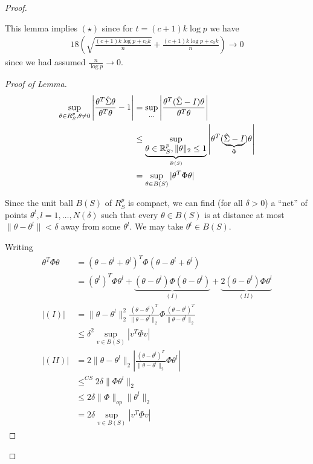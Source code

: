 \begin{proof}
\begin{lem}
    This lemma implies $(\star)$ since for $t = (c+1) k \log p$ we
    have
    \begin{align}
      \label{eq:158}
      18(\sqrt{\frac{(c+1)k \log p + c_{0} k}{n}} + \frac{(c+1)k \log
        p + c_{0} k}{n}) \rightarrow 0
    \end{align} since we had assumed $\frac{n}{\log p} \rightarrow 0$.
  \end{lem}
  \begin{proof}[Proof of Lemma]
    \begin{align}
      \label{eq:159}
      \sup_{\theta \in R^{p}_{S}, \theta \neq 0} \left|
        \frac{\theta^{T} \hat \Sigma \theta}{\theta^{T} \theta} - 1
      \right| &= \sup_{\dots} \left| \frac{\theta^{T} (\hat \Sigma - I)
          \theta}{\theta^{T} \theta} \right| \\
      &\leq \sup_{\underbrace{\theta \in \mathbb{R}^{p}_{S}, \| \theta \|_{2} \leq 1}_{B(S)}}
      \left| \theta^{T} (\underbrace{\hat \Sigma - I}_{\Phi}) \theta
      \right| \\
      &= \sup_{\theta \in B(S)} | \theta^{T} \Phi \theta |
    \end{align}

    Since the unit ball $B(S)$ of $R^{p}_{S}$ is compact, we can find
    (for all $\delta > 0$) a ``net'' of points $\theta^{l}, l = 1,
    \dots, N(\delta)$ such that every $\theta \in B(S)$ is at distance
    at most $\| \theta - \theta^{l} \| < \delta$ away from some
    $\theta^{l}$.  We may take $\theta^{l} \in B(S)$.

    Writing
    \begin{align}
      \label{eq:160}
      \theta^{T} \Phi \theta &= (\theta - \theta^{l} + \theta^{l})^{T}
      \Phi (\theta - \theta^{l} + \theta^{l}) \\
      &= (\theta^{l})^{T} \Phi \theta^{l} + \underbrace{(\theta -
        \theta^{l}) \Phi (\theta - \theta^{l})}_{(I)} +
      \underbrace{2(\theta - \theta^{l}) \Phi \theta^{l}}_{(II)} \\
      |(I)| &= \| \theta - \theta^{l} \|_{2}^{2} \frac{(\theta -
        \theta^{l})^{T}}{\| \theta - \theta^{l} \|_{2}} \Phi
      \frac{(\theta - \theta^{l})^{T}}{\| \theta - \theta^{l} \|_{2}}
      \\
      &\leq \delta^{2} \sup_{v \in B(S)} |v^{T} \Phi v| \\
      |(II)| &= 2 \|
      \theta - \theta^{l} \|_{2} \left| \frac{(\theta -
          \theta^{l})^{T}}{\| \theta - \theta^{l}\|_{2}} \Phi
        \theta^{l}
      \right| \\
      &\leq^{CS} 2 \delta \| \Phi \theta^{l} \|_{2} \\
      &\leq 2 \delta \| \Phi \|_{op} \| \theta^{l} \|_{2} \\
      &= 2 \delta \sup_{v \in B(S)} |v^{T} \Phi v|
    \end{align}


\end{proof}
\end{proof}
